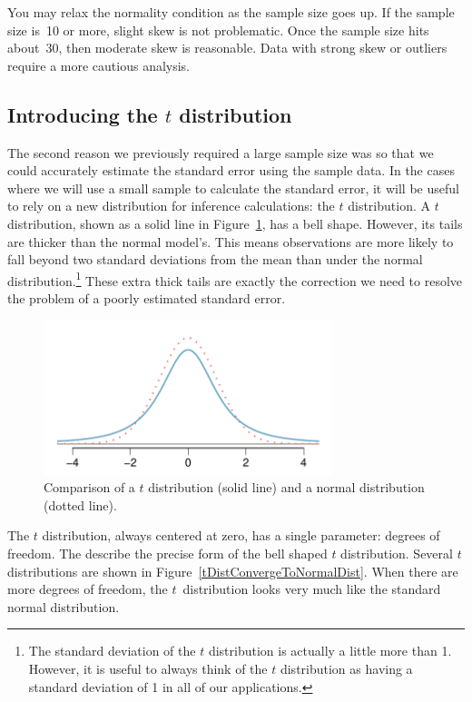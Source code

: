 You may relax the normality condition as the sample size goes up. If the sample size is~10 or more, slight skew is not problematic. Once the sample size hits about~30, then moderate skew is reasonable. Data with strong skew or outliers require a more cautious analysis.


\subsection{Introducing the $t$ distribution}
\label{introducingTheTDistribution}


The second reason we previously required a large sample size was so that we could accurately estimate the standard error using the sample data. In the cases where we will use a small sample to calculate the standard error, it will be useful to rely on a new distribution for inference calculations: the $t$ distribution. A $t$ distribution, shown as a solid line in Figure~\ref{tDistCompareToNormalDist}, has a bell shape. However, its tails are thicker than the normal model's. This means observations are more likely to fall beyond two standard deviations from the mean than under the normal distribution.\footnote{The standard deviation of the $t$ distribution is actually a little more than 1. However, it is useful to always think of the $t$ distribution as having a standard deviation of 1 in all of our applications.} These extra thick tails are exactly the correction we need to resolve the problem of a poorly estimated standard error.

\begin{figure}
\centering
\includegraphics[height=45mm]{05/figures/tDistCompareToNormalDist/tDistCompareToNormalDist}
\caption{Comparison of a $t$ distribution (solid line) and a normal distribution (dotted line).}
\label{tDistCompareToNormalDist}
\end{figure}

The $t$ distribution, always centered at zero, has a single parameter: degrees of freedom. The  describe the precise form of the bell shaped $t$ distribution. Several $t$ distributions are shown in Figure~\ref{tDistConvergeToNormalDist}. When there are more degrees of freedom, the $t$~distribution looks very much like the standard normal distribution.


